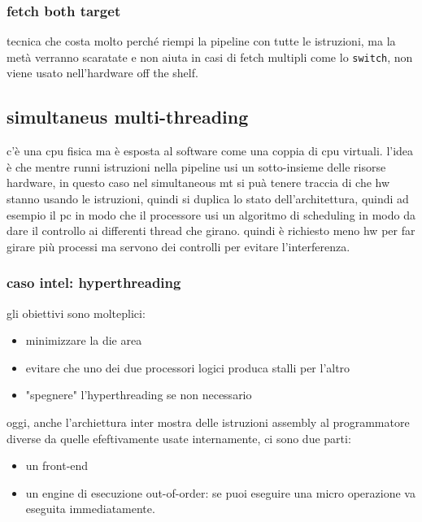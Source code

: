 \documentclass[12pt, oneside]{extbook} %
\begin{document}
\subsubsection{fetch both target}
tecnica che costa molto perché riempi la pipeline con tutte le istruzioni, ma la metà verranno scaratate e non aiuta in casi di fetch multipli come lo \texttt{switch}, non viene usato nell'hardware off the shelf.

\subsection{simultaneus multi-threading}
c'è una cpu fisica ma è esposta al software come una coppia di cpu virtuali. l'idea è che mentre runni istruzioni nella pipeline usi un sotto-insieme delle risorse hardware, in questo caso nel simultaneous mt si puà tenere traccia di che hw stanno usando le istruzioni, quindi si duplica lo stato dell'architettura, quindi ad esempio il pc in modo che il processore usi un algoritmo di scheduling in modo da dare il controllo ai differenti thread che girano. quindi è richiesto meno hw per far girare più processi ma servono dei controlli per evitare l'interferenza.
\subsubsection{caso intel: hyperthreading}
gli obiettivi sono molteplici:
\begin{itemize}
\item minimizzare la die area
\item evitare che uno dei due processori logici produca stalli per l'altro
\item "spegnere" l'hyperthreading se non necessario
\end{itemize}
oggi, anche l'archiettura inter mostra delle istruzioni assembly al programmatore diverse da quelle efeftivamente usate internamente, ci sono due parti:
\begin{itemize}
\item un front-end
\item un engine di esecuzione out-of-order: se puoi eseguire una micro operazione va eseguita immediatamente.
\end{itemize}
\end{document}
